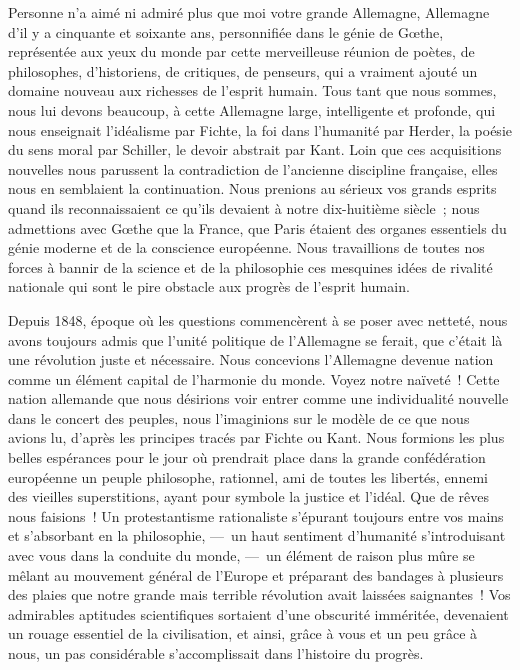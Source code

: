 \documentclass[french,twoside]{book} %
\newcommand\orgName[1]{#1}
\newcommand\persName[1]{#1}
\begin{document}
Personne n’a aimé ni admiré plus que moi votre grande {\orgName Allemagne}, {\orgName Allemagne} d’il y a cinquante et soixante ans, personnifiée dans le génie de {\persName Gœthe}, représentée aux yeux du monde par cette merveilleuse réunion de poètes, de philosophes, d’historiens, de critiques, de penseurs, qui a vraiment ajouté un domaine nouveau aux richesses de l’esprit humain. Tous tant que nous sommes, nous lui devons beaucoup, à cette {\orgName Allemagne} large, intelligente et profonde, qui nous enseignait l’idéalisme par {\persName Fichte}, la foi dans l’humanité par Herder, la poésie du sens moral par {\persName Schiller}, le devoir abstrait par {\persName Kant}. Loin que ces acquisitions nouvelles nous parussent la contradiction de l’ancienne discipline française, elles nous en semblaient la continuation. Nous prenions au sérieux vos grands esprits quand ils reconnaissaient ce qu’ils devaient à notre dix-huitième siècle ; nous admettions avec {\persName Gœthe} que la {\orgName France}, que {\orgName Paris} étaient des organes essentiels du génie moderne et de la conscience européenne. Nous travaillions de toutes nos forces à bannir de la science et de la philosophie ces mesquines idées de rivalité nationale qui sont le pire obstacle aux progrès de l’esprit humain.\par
Depuis 1848, époque où les questions commencèrent à se poser avec netteté, nous avons toujours admis que l’unité politique de l’{\orgName Allemagne} se ferait, que c’était là une révolution juste et nécessaire. Nous concevions l’{\orgName Allemagne} devenue nation comme un élément capital de l’harmonie du monde. Voyez notre naïveté ! Cette {\orgName nation allemande} que nous désirions voir entrer comme une individualité nouvelle dans le concert des peuples, nous l’imaginions sur le modèle de ce que nous avions lu, d’après les principes tracés par {\persName Fichte} ou {\persName Kant}. Nous formions les plus belles espérances pour le jour où prendrait place dans la grande confédération européenne un peuple philosophe, rationnel, ami de toutes les libertés, ennemi des vieilles superstitions, ayant pour symbole la justice et l’idéal. Que de rêves nous faisions ! Un protestantisme rationaliste s’épurant toujours entre vos mains et s’absorbant en la philosophie, — un haut sentiment d’humanité s’introduisant avec vous dans la conduite du monde, — un élément de raison plus mûre se mêlant au mouvement général de l’{\orgName Europe} et préparant des bandages à plusieurs des plaies que notre grande mais terrible révolution avait laissées saignantes ! Vos admirables aptitudes scientifiques sortaient d’une obscurité imméritée, devenaient un rouage essentiel de la civilisation, et ainsi, grâce à vous et un peu grâce à nous, un pas considérable s’accomplissait dans l’histoire du progrès.\par
\end{document}
